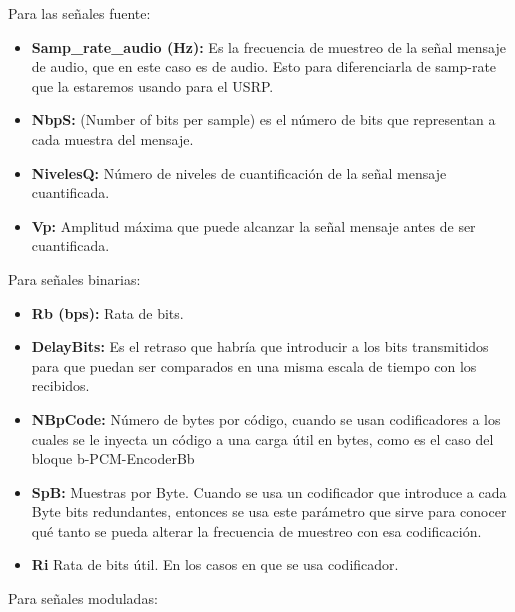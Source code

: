 Para las señales fuente:

\begin{itemize}
	\item  \textbf{Samp\_rate\_audio (Hz):}  Es la frecuencia de muestreo de la señal mensaje de audio, que en este caso es de audio. Esto para diferenciarla de samp-rate que la estaremos usando para el USRP.
	\item  \textbf{NbpS:}  (Number of bits per sample) es el número de bits que representan a cada muestra del mensaje.
	\item   \textbf{NivelesQ:}  Número de niveles de cuantificación de la señal mensaje cuantificada.
	\item  \textbf{Vp:} Amplitud máxima que puede alcanzar la señal mensaje antes de ser cuantificada.		
\end{itemize}

Para señales binarias:

\begin{itemize}
	\item  \textbf{Rb (bps):} Rata de bits.
	\item  \textbf{DelayBits:} Es el retraso que habría que introducir a los bits transmitidos para que puedan ser comparados en una misma escala de tiempo con los recibidos.
	\item  \textbf{NBpCode:} Número de bytes por código, cuando se usan codificadores a los cuales se le inyecta un código a una carga útil en bytes, como es el caso del bloque b-PCM-EncoderBb
	\item  \textbf{SpB:} Muestras por Byte. Cuando se usa un codificador que introduce a cada Byte bits redundantes, entonces se usa este parámetro que sirve para conocer qué tanto se pueda alterar la frecuencia de muestreo con esa codificación.
	\item   \textbf{Ri}  Rata de bits útil. En los casos en que se usa codificador.
\end{itemize}

Para señales moduladas:

